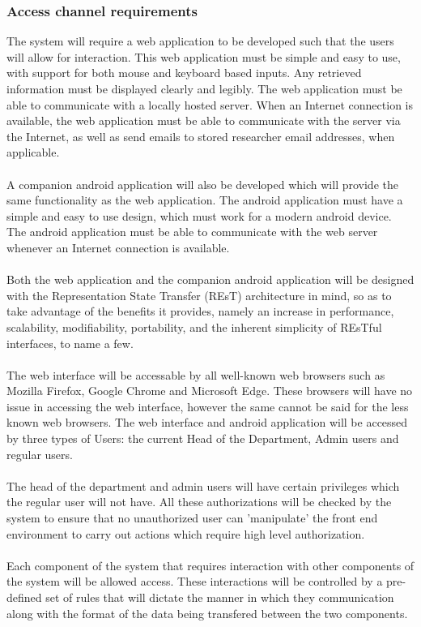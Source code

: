 \documentclass{article}
\begin{document}
	\subsubsection{Access channel requirements}
	The system will require a web application to be developed such that the users will allow for interaction. This web application 
	must be simple and easy to use, with support for both mouse and keyboard based inputs. Any retrieved information must be displayed clearly and legibly. The web 
	application must be able to communicate with a locally hosted server. When an Internet connection is available, 
	the web application must be able to communicate with the server via the Internet, as well as send emails to stored 
	researcher email addresses, when applicable.\\ \\
%
	A companion android application will also be developed which will provide the same functionality as the web application.
	The android application must have a simple and easy to use design, which must work for a modern android device. The android 
	application must be able to communicate with the web server whenever an Internet connection is available.\\ \\
%
	Both the web application and the companion android application will be designed with the Representation State Transfer (REsT) 
	architecture in mind, so as to take advantage of the benefits it provides, namely an increase in performance, scalability, modifiability, 
	portability, and the inherent simplicity of REsTful interfaces, to name a few.
	\\ \\
	The web interface will be accessable by all well-known web browsers such as Mozilla Firefox, Google Chrome and Microsoft Edge. These browsers
	will have no issue in accessing the web interface, however the same cannot be said for the less known web browsers. The web interface and android 
	application will be accessed by three types of Users: the current Head of the Department, Admin users and regular users.
	\\ \\
	The head of the department and admin users will have certain privileges which the regular user will not have. All these authorizations will be checked 
	by the system to ensure that no unauthorized user can 'manipulate' the front end environment to carry out actions which require high level authorization. 
	\\ \\ 
	Each component of the system that requires interaction with other components of the system will be allowed access. These interactions will be controlled by a pre-defined
	set of rules that will dictate the manner in which they communication along with the format of the data being transfered between the two components. 
\end{document}
